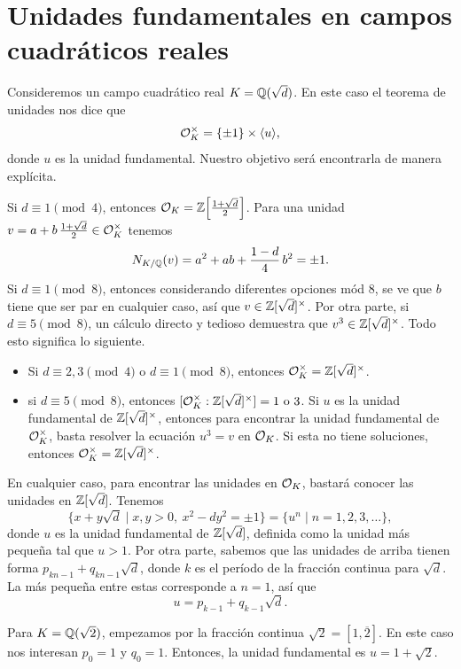 
\section{Unidades fundamentales en campos cuadráticos reales}

Consideremos un campo cuadrático real $K = \mathbb{Q} (\sqrt{d})$. En este caso el
teorema de unidades nos dice que
$$\mathcal{O}_K^\times = \{ \pm 1 \} \times \langle u\rangle,$$
donde $u$ es la unidad fundamental. Nuestro objetivo será encontrarla de manera
explícita.

Si $d \equiv 1 \pmod{4}$, entonces
$\mathcal{O}_K = \mathbb{Z} \Bigl[\frac{1+\sqrt{d}}{2}\Bigr]$. Para una unidad
$v = a + b\,\frac{1+\sqrt{d}}{2} \in \mathcal{O}_K^\times$ tenemos
$$N_{K/\mathbb{Q}} (v) = a^2 + ab + \frac{1 - d}{4}\,b^2 = \pm 1.$$
Si $d \equiv 1 \pmod{8}$, entonces considerando diferentes opciones mód $8$,
se ve que $b$ tiene que ser par en cualquier caso, así que
$v \in \mathbb{Z} [\sqrt{d}]^\times$. Por otra parte, si $d \equiv 5 \pmod{8}$, un
cálculo directo y tedioso demuestra que $v^3 \in \mathbb{Z} [\sqrt{d}]^\times$.
Todo esto significa lo siguiente.
\begin{itemize}
\item Si $d \equiv 2,3 \pmod{4}$ o $d \equiv 1 \pmod{8}$, entonces
  $\mathcal{O}_K^\times = \mathbb{Z} [\sqrt{d}]^\times$.

\item si $d \equiv 5 \pmod{8}$, entonces
  $[\mathcal{O}_K^\times : \mathbb{Z} [\sqrt{d}]^\times] = 1\text{ o }3$.
  Si $u$ es la unidad fundamental de $\mathbb{Z} [\sqrt{d}]^\times$, entonces para
  encontrar la unidad fundamental de $\mathcal{O}_K^\times$, basta resolver la ecuación
  $u^3 = v$ en $\mathcal{O}_K$. Si esta no tiene soluciones, entonces
  $\mathcal{O}_K^\times = \mathbb{Z} [\sqrt{d}]^\times$.
\end{itemize}
En cualquier caso, para encontrar las unidades en $\mathcal{O}_K$, bastará conocer las
unidades en $\mathbb{Z} [\sqrt{d}]$. Tenemos
\[ \{ x + y\sqrt{d} \mid x,y > 0, ~ x^2 - dy^2 = \pm 1 \} =
\{ u^n \mid n = 1,2,3,\ldots \}, \]
donde $u$ es la unidad fundamental de $\mathbb{Z} [\sqrt{d}]$, definida como la unidad
más pequeña tal que $u > 1$. Por otra parte, sabemos que las unidades de arriba
tienen forma $p_{kn-1} + q_{kn-1}\sqrt{d}$, donde $k$ es el período de la fracción
continua para $\sqrt{d}$. La más pequeña entre estas corresponde a $n = 1$, así
que
$$u = p_{k-1} + q_{k-1}\sqrt{d}.$$

\begin{ejemplo}
  Para $K = \mathbb{Q} (\sqrt{2})$, empezamos por la fracción continua
  $\sqrt{2} = [1,\overline{2}]$. En este caso nos interesan $p_0 = 1$
  y $q_0 = 1$. Entonces, la unidad fundamental es $u = 1 + \sqrt{2}$.
\end{ejemplo}

